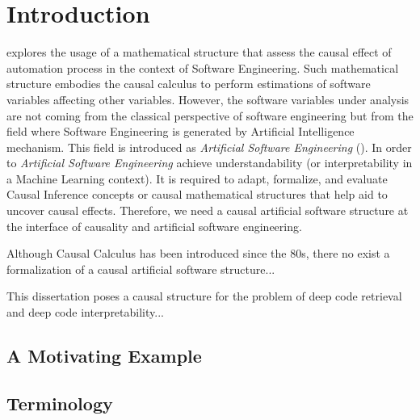 \chapter{Introduction} %
\label{ch:intro}



 explores the usage of a mathematical structure that assess the causal effect of automation process in the context of Software Engineering. Such mathematical structure embodies the causal calculus to perform estimations of software variables affecting other variables. However, the software variables under analysis are not coming from the classical perspective of software engineering but from the field where Software Engineering is generated by Artificial Intelligence mechanism. This field is introduced as \textit{Artificial Software Engineering} (\asofte). In order to \textit{Artificial Software Engineering} achieve understandability (or interpretability in a Machine Learning context). It is required to adapt, formalize, and evaluate Causal Inference concepts or causal mathematical structures that help aid to uncover causal effects. Therefore, we need a causal artificial software structure at the interface of causality and artificial software engineering.  

Although Causal Calculus has been introduced since the 80s, there no exist a formalization of a causal artificial software structure...  

This dissertation poses a causal structure for the problem of deep code retrieval and deep code interpretability...







\section{A Motivating Example}

\section{Terminology}

